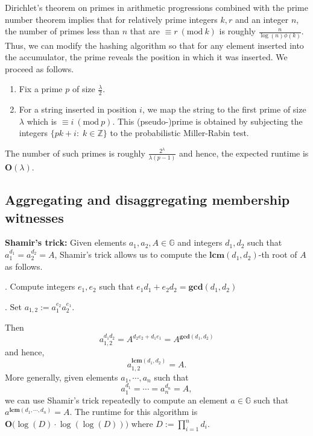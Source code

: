 \documentclass[11pt, lettersize, notitlepage, leqno, footskip=0.6cm]{article}
\newcommand{\bz}{\mathbb Z}
\newcommand{\mb}{\mathbb}
\newcommand{\mbf}{\mathbf}
\newcommand{\lam}{\lambda}
\newcommand{\vs}{\vspace{-0.15cm}}
\newcommand{\noin}{\noindent}
\newcommand{\Mod}[1]{\ (\mathrm{mod}\ #1)}
\newcommand{\LCM}{\mbf{lcm}}
\newcommand{\GCD}{\mbf{gcd}}
\numberwithin{equation}{section}
\begin{document}
Dirichlet's theorem on primes in arithmetic progressions combined with the prime number theorem implies that for relatively prime integers $k,r$ and an integer $n$, the number of primes less than $n$ that are $\equiv r\Mod{k}$ is roughly $\frac{n}{\log(n)\phi(k)}$. Thus, we can modify the hashing algorithm so that for any element inserted into the accumulator, the prime reveals the position in which it was inserted. We proceed as follows.\begin{enumerate}[wide, labelwidth=!, labelindent=0pt]\vspace{-0.1cm} 

\item Fix a prime $p$ of size $\frac{\lam}{2}$. \vs 

\item For a string inserted in position $i$, we map the string to the first prime of size $\lam$ which is $\equiv i\Mod{p}$. This (pseudo-)prime is obtained by subjecting the integers $\{pk+i:\;k\in\bz\}$ to the probabilistic Miller-Rabin test. \end{enumerate} 

\noin The number of such primes is roughly \vs $\frac{2^{\lam}}{\lam (p-1)}$ and hence, the expected runtime is $\mbf{O}(\lam)$.






\subsection{\fontsize{11}{11}\selectfont Aggregating and disaggregating membership witnesses}

\noindent \textbf{Shamir's trick:} Given elements $a_1, a_2, A\in \mb{G}$ and integers $d_1, d_2$ such that $a_1^{d_1} = a_2^{d_2} = A$, Shamir's trick allows us to compute the $\LCM(d_1, d_2)$-th root of $A$ as follows.\vspace{0.1cm}

\noin 1. Compute integers $e_1, e_2$ such that $e_1d_1+e_2d_2 = \GCD(d_1, d_2)$

\noin 2. Set $a_{1,2}:= a_1^{e_2}a_2^{e_1} $. 

\noindent Then \vspace{-0.15cm}$$a_{1,2}^{d_1d_2} = A^{d_2e_2 + d_1e_1} = A^{\GCD(d_1,d_2)}$$ and hence, \vspace{-0.15cm}$$a_{1,2}^{\LCM(d_1,d_2)} = A.$$ More generally, given elements $a_1,\cdots,a_n$ such that \vs $$a_1^{d_1} = \cdots = a_n^{d_n} = A, $$ we can use Shamir's trick repeatedly to compute an element $a\in\mb{G}$ such that $a^{\LCM(d_1,\cdots,d_n)} = A.$ The runtime for this algorithm is $\mbf{O}\big(\log(D)\cdot \log(\log(D))\big)$ where $D:= \prod_{i=1}^n d_i$.
\end{document}
